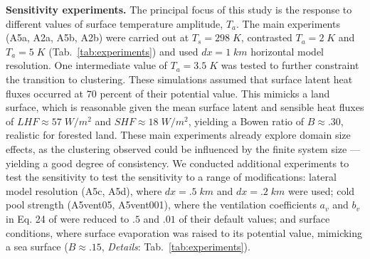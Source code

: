 \documentclass[draft,linenumbers]{agujournal2019}
\begin{document}
\noindent
{\bf Sensitivity experiments.} 
The principal focus of this study is the response to different values of surface temperature amplitude, $T_a$. 
The main experiments (A5a, A2a, A5b, A2b) were carried out at $T_s=298\;K$, contrasted $T_a=2\;K$ and $T_a=5\;K$ (Tab.~\ref{tab:experiments}) and used $dx=1\;km$ horizontal model resolution.
One intermediate value of $T_a=3.5\;K$ was tested to further constraint the transition to clustering.
These simulations assumed that surface latent heat fluxes occurred at $70$ percent of their potential value. This mimicks a land surface, which is reasonable given the mean surface latent and sensible heat fluxes of $LHF\approx 57\;W/m^2$ and $SHF\approx 18\;W/m^2$, yielding a Bowen ratio of $B\approx .30$, realistic for forested land. 
These main experiments already explore domain size effects, as the clustering observed could be influenced by the finite system size --- yielding a good degree of consistency.
We conducted additional experiments to test the sensitivity to test the sensitivity to a range of modifications: lateral model resolution (A5c, A5d), where $dx=.5\;km$ and $dx=.2\;km$ were used; cold pool strength (A5vent05, A5vent001), where the ventilation coefficients $a_v$ and $b_v$ in Eq. 24 of \citeauthor{seifert2006two} \citeyear{seifert2006two} were reduced to $.5$ and $.01$ of their default values; and surface conditions, where surface evaporation was raised to its potential value, mimicking a sea surface ($B\approx .15$, {\it Details}: Tab.~\ref{tab:experiments}).
\end{document}
